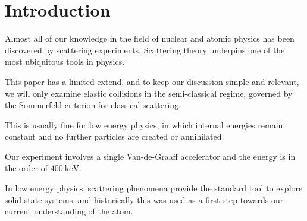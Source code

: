 \section{Introduction} 




Almost all of our knowledge in the field of nuclear and atomic physics has been discovered by scattering experiments. Scattering theory underpins one of the most ubiquitous tools in physics. 

This paper has a limited extend, and to keep our discussion simple and
relevant, we will only examine elastic collisions in the semi-classical regime, governed by the Sommerfeld criterion for classical scattering.

This is usually fine for low energy physics, in which internal energies remain
constant and no further particles are created or annihilated. 

Our experiment involves a single Van-de-Graaff accelerator and the energy is in the order of $\SI{400}{\kilo\electronvolt}$.

In low energy physics, scattering phenomena provide the standard tool to
explore solid state systems, and historically this was used as a first step
towards our current understanding of the atom.


